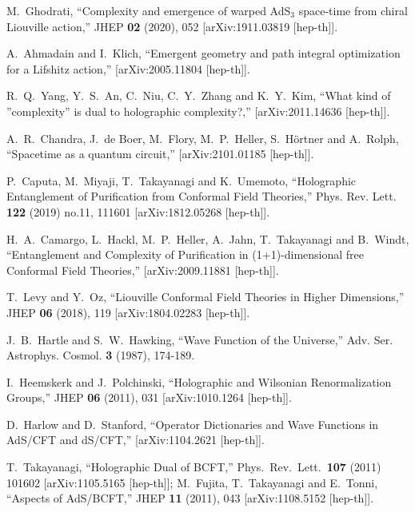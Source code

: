 \documentclass[a4paper,12pt]{article}
\begin{document}
\begin{thebibliography}{}
M.~Ghodrati,
``Complexity and emergence of warped AdS$_{3}$ space-time from chiral Liouville action,''
JHEP \textbf{02} (2020), 052
[arXiv:1911.03819 [hep-th]].

A.~Ahmadain and I.~Klich,
``Emergent geometry and path integral optimization for a Lifshitz action,''
[arXiv:2005.11804 [hep-th]].

R.~Q.~Yang, Y.~S.~An, C.~Niu, C.~Y.~Zhang and K.~Y.~Kim,
``What kind of ''complexity'' is dual to holographic complexity?,''
[arXiv:2011.14636 [hep-th]].

A.~R.~Chandra, J.~de Boer, M.~Flory, M.~P.~Heller, S.~H\"ortner and A.~Rolph,
``Spacetime as a quantum circuit,''
[arXiv:2101.01185 [hep-th]].


P.~Caputa, M.~Miyaji, T.~Takayanagi and K.~Umemoto,
``Holographic Entanglement of Purification from Conformal Field Theories,''
Phys. Rev. Lett. \textbf{122} (2019) no.11, 111601
[arXiv:1812.05268 [hep-th]].

H.~A.~Camargo, L.~Hackl, M.~P.~Heller, A.~Jahn, T.~Takayanagi and B.~Windt,
``Entanglement and Complexity of Purification in (1+1)-dimensional free Conformal Field Theories,''
[arXiv:2009.11881 [hep-th]].

T.~Levy and Y.~Oz,
``Liouville Conformal Field Theories in Higher Dimensions,''
JHEP \textbf{06} (2018), 119
[arXiv:1804.02283 [hep-th]].

J.~B.~Hartle and S.~W.~Hawking,
``Wave Function of the Universe,''
Adv. Ser. Astrophys. Cosmol. \textbf{3} (1987), 174-189.

I.~Heemskerk and J.~Polchinski,
``Holographic and Wilsonian Renormalization Groups,''
JHEP \textbf{06} (2011), 031
[arXiv:1010.1264 [hep-th]].

D.~Harlow and D.~Stanford,
``Operator Dictionaries and Wave Functions in AdS/CFT and dS/CFT,''
[arXiv:1104.2621 [hep-th]].


 T.~Takayanagi,
  ``Holographic Dual of BCFT,'' 
   Phys.\ Rev.\ Lett.\  {\bf 107} (2011) 101602  %
[arXiv:1105.5165 [hep-th]];  %
M.~Fujita, T.~Takayanagi and E.~Tonni,
``Aspects of AdS/BCFT,''
JHEP \textbf{11} (2011), 043
[arXiv:1108.5152 [hep-th]].


\end{thebibliography}
\end{document}
